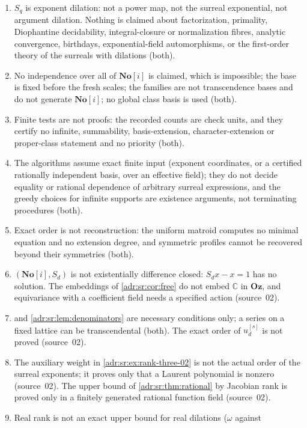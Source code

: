 \documentclass[11pt,letterpaper]{article}
\numberwithin{equation}{section}
\theoremstyle{definition}
\theoremstyle{remark}
\newcommand{\Oz}{\mathbf{Oz}}
\newcommand{\SC}{\mathbf{No}[i]}
\newcommand{\C}{\mathbb C}
\begin{document}
\begin{enumerate}[label=R\arabic*.,leftmargin=2.6em,itemsep=2pt]
exponential-compatible, and nothing is claimed about differential
transcendence under a natural surreal derivation (both).
\item $S_q$ is exponent dilation: not a power map, not the surreal exponential,
not argument dilation. Nothing is claimed about factorization, primality,
Diophantine decidability, integral-closure or normalization fibres, analytic
convergence, birthdays, exponential-field automorphisms, or the first-order
theory of the surreals with dilations (both).
\item No independence over all of $\SC$ is claimed, which is impossible; the
base is fixed before the fresh scales; the families are not transcendence
bases and do not generate $\SC$; no global class basis is used (both).
\item Finite tests are not proofs: the recorded counts are check units, and
they certify no infinite, summability, basis-extension, character-extension or
proper-class statement and no priority (both).
\item The algorithms assume exact finite input (exponent coordinates, or a
certified rationally independent basis, over an effective field); they do not
decide equality or rational dependence of arbitrary surreal expressions, and
the greedy choices for infinite supports are existence arguments, not
terminating procedures (both).
\item Exact order is not reconstruction: the uniform matroid computes no
minimal equation and no extension degree, and symmetric profiles cannot be
recovered beyond their symmetries (both).
\item $(\SC,S_d)$ is not existentially difference closed: $S_dx-x=1$ has no
solution. The embeddings of \cref{adr:sr:cor:free} do not embed $\C$ in $\Oz$,
and equivariance with a coefficient field needs a specified action (source~02).
\item {} and \cref{adr:sr:lem:denominators} are
necessary conditions only; a series on a fixed lattice can be transcendental
(both). The exact order of $u_d^{[s]}$ is not proved (source~02).
\item The auxiliary weight in \cref{adr:sr:ex:rank-three-02} is not the actual
order of the surreal exponents; it proves only that a Laurent polynomial is
nonzero (source~02). The upper bound of \cref{adr:sr:thm:rational} by
Jacobian rank is proved only in a finitely generated rational function field
(source~02).
\item Real rank is not an exact upper bound for real dilations ($\omega$ against

\end{enumerate}
\end{document}
